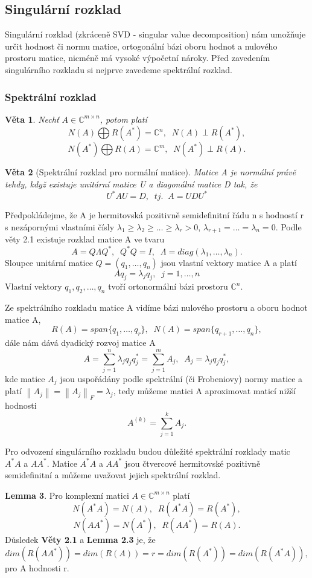 \documentclass{article}
\theoremstyle{plain}
\newtheorem{veta}{Věta}[section]
\theoremstyle{definition}
\newtheorem{lemma}[veta]{Lemma}
\begin{document}
\subsection{Singulární rozklad}
Singulární rozklad (zkráceně SVD - singular value decomposition) nám umožňuje určit hodnost či normu matice, ortogonální bázi oboru hodnot a nulového prostoru matice, nicméně má vysoké výpočetní nároky. Před zavedením singulárního rozkladu si nejprve zavedeme spektrální rozklad.
\subsubsection{Spektrální rozklad}
\begin{veta}
Nechť $A \in \mathbb{C}^{m \times n}$, potom platí 
$$N(A) \bigoplus R(A^*) = \mathbb{C}^n,\;\;N(A) \perp R(A^*),$$
$$N(A^*) \bigoplus R(A) = \mathbb{C}^m,\;\;N(A^*) \perp R(A).$$
\end{veta}
\begin{veta}[Spektrální rozklad pro normální matice]
Matice A je normální právě tehdy, když existuje unitární matice U a diagonální matice D tak, že
$$U^{*}AU=D,\;\; tj. \;\;A=UDU^{*}$$
\end{veta}
Předpokládejme, že A je hermitovská pozitivně semidefinitní řádu n s hodností r s nezápornými vlastními čísly $\lambda_1 \geq \lambda_2 \geq \hdots \geq \lambda_r > 0$, $\lambda_{r+1}=\hdots=\lambda_n=0$. Podle věty 2.1 existuje rozklad matice A ve tvaru
$$A=Q\Lambda Q^*,\;\;Q^*Q=I,\;\;\Lambda=diag(\lambda_1,\hdots,\lambda_n).$$
Sloupce unitární matice $Q=(q_1,\hdots,q_n)$ jsou vlastní vektory matice A a platí
$$Aq_j=\lambda_jq_j,\;\;j=1,\hdots,n$$
Vlastní vektory $q_1,q_2,\hdots,q_n$ tvoří ortonormální bázi prostoru $\mathbb{C}^n$.

Ze spektrálního rozkladu matice A vidíme bázi nulového prostoru a oboru hodnot matice A, $$R(A)=span\{q_1,\hdots,q_r\},\;\;N(A)=span\{q_{r+1},\hdots,q_n\},$$ dále nám dává dyadický rozvoj matice A $$A=\sum_{j=1}^{n} \lambda_j q_j q_j^*=\sum_{j=1}^{m}A_j,\;\;A_j=\lambda_j q_j q_j^*,$$ kde matice $A_j$ jsou uspořádány podle spektrální (či Frobeniovy) normy matice a platí $\left \lVert A_j \right \rVert=\left \lVert A_j \right \rVert _F=\lambda_j$, tedy můžeme matici A aproximovat maticí nižší hodnosti $$A^{(k)}=\sum_{j=1}^k A_j.$$

Pro odvození singulárního rozkladu budou důležité spektrální rozklady matic $A^*A$ a $AA^*$. Matice $A^*A$ a $AA^*$ jsou čtvercové hermitovské pozitivně semidefinitní a můžeme uvažovat jejich spektrální rozklad.
\begin{lemma}
Pro komplexní matici $A \in \mathbb{C}^{m \times n}$ platí $$N(A^*A)=N(A),\;\;R(A^*A)=R(A^*),$$
$$N(AA^*)=N(A^*),\;\;R(AA^*)=R(A).$$
Důsledek \textbf{Věty 2.1} a \textbf{Lemma 2.3} je, že 
$$dim(R(AA^*))=dim(R(A))=r=dim(R(A^*))=dim(R(A^*A)),$$
pro A hodnosti r.
\end{lemma}
\end{document}
